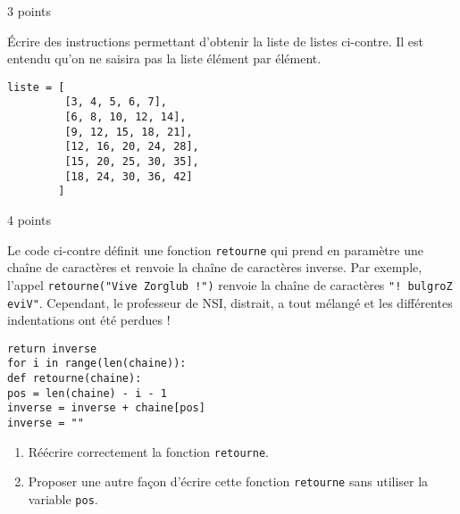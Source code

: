 \documentclass[a4paper,dvipsnames]{article}
\begin{document}
\medskip

\begin{exercice}{3 points}{}
  \begin{multicols}{2}
    \vspace*{1cm}
    Écrire des instructions permettant d'obtenir la liste de listes ci-contre. Il est entendu qu'on ne saisira pas la liste \og{}élément par élément\fg{}. \columnbreak

      \begin{verbatim}
liste = [
         [3, 4, 5, 6, 7],
         [6, 8, 10, 12, 14],
         [9, 12, 15, 18, 21],
         [12, 16, 20, 24, 28],
         [15, 20, 25, 30, 35],
         [18, 24, 30, 36, 42]
        ]
      \end{verbatim}
  \end{multicols}
\end{exercice}

\medskip

\begin{exercice}{4 points}{}
 \begin{multicols}{2}
   Le code ci-contre définit une fonction \texttt{retourne} qui prend en paramètre une chaîne de caractères et renvoie la chaîne de caractères \og{}inverse\fg{}. Par exemple, l'appel \texttt{retourne("Vive Zorglub !")} renvoie la chaîne de caractères \texttt{"! bulgroZ eviV"}. Cependant, le professeur de NSI, distrait, a tout mélangé et les différentes indentations ont été perdues ! \columnbreak

      \begin{verbatim}
return inverse
for i in range(len(chaine)):
def retourne(chaine):
pos = len(chaine) - i - 1
inverse = inverse + chaine[pos]
inverse = ""
      \end{verbatim}
 \end{multicols}

 \begin{enumerate}
   \item Réécrire correctement la fonction \texttt{retourne}.
   \item Proposer une autre façon d'écrire cette fonction \texttt{retourne} sans utiliser la variable \texttt{pos}.
 \end{enumerate}
\end{exercice}
\end{document}
